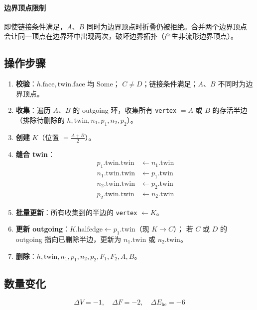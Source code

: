 \documentclass[11pt,a4paper]{article}
\begin{document}
\paragraph{边界顶点限制}
即使链接条件满足，$A$、$B$ 同时为边界顶点时折叠仍被拒绝。合并两个边界顶点
会让同一顶点在边界环中出现两次，破坏边界拓扑（产生非流形边界顶点）。

\subsection{操作步骤}

\begin{enumerate}
  \item \textbf{校验}：$h.\mathrm{face}, \mathrm{twin}.\mathrm{face}$ 均 $\mathrm{Some}$；
        $C \neq D$；链接条件满足；$A$、$B$ 不同时为边界顶点。
  \item \textbf{收集}：遍历 $A$、$B$ 的 outgoing 环，收集所有 \texttt{vertex} $= A$ 或 $B$
        的存活半边（排除待删除的 $h, \mathrm{twin}, n_1, p_1, n_2, p_2$）。
  \item \textbf{创建} $K$（位置 $= \frac{A + B}{2}$）。
  \item \textbf{缝合 twin}：
    \begin{align}
      p_1.\mathrm{twin}.\mathrm{twin} &\leftarrow n_1.\mathrm{twin} \\
      n_1.\mathrm{twin}.\mathrm{twin} &\leftarrow p_1.\mathrm{twin} \\
      n_2.\mathrm{twin}.\mathrm{twin} &\leftarrow p_2.\mathrm{twin} \\
      p_2.\mathrm{twin}.\mathrm{twin} &\leftarrow n_2.\mathrm{twin}
    \end{align}
  \item \textbf{批量更新}：所有收集到的半边的 \texttt{vertex} $\leftarrow K$。
  \item \textbf{更新 outgoing}：$K.\mathrm{halfedge} \leftarrow p_1.\mathrm{twin}$（现 $K \to C$）；
        若 $C$ 或 $D$ 的 outgoing 指向已删除半边，更新为 $n_1.\mathrm{twin}$ 或 $n_2.\mathrm{twin}$。
  \item \textbf{删除}：$h, \mathrm{twin}, n_1, p_1, n_2, p_2, F_1, F_2, A, B$。
\end{enumerate}

\subsection{数量变化}

\[
  \Delta V = -1, \quad \Delta F = -2, \quad \Delta E_{\mathrm{he}} = -6
\]
\end{document}
